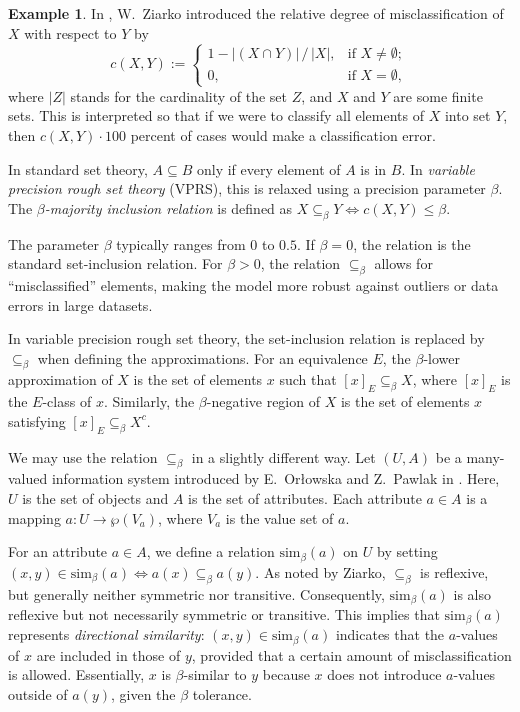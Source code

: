 \documentclass[11pt,a4paper]{amsart}
\theoremstyle{plain}
\theoremstyle{definition}
\newtheorem{example}[theorem]{Example}
\theoremstyle{remark}
\numberwithin{equation}{section}
\begin{document}
\begin{example}
In \cite{Ziarko1993}, W.~Ziarko introduced the relative degree of misclassification of $X$ with 
respect to $Y$ by
\[ c(X,Y) := 
\left \{ 
\begin{array}{ll}
1 - |(X \cap Y)| \, / \, |X|, & \text{if $X \neq \emptyset$}; \\
0, & \text{if $X = \emptyset$},
\end{array}  \right .
\]
where $|Z|$ stands for the cardinality of the set $Z$,
and $X$ and $Y$ are some finite sets.
This is interpreted so that if we were to classify all 
elements of $X$ into set $Y$, then $c(X,Y) \cdot 100$ 
percent of cases would make a classification error.

In standard set theory, $A \subseteq B$ only if every 
element of $A$ is in $B$. In 
\emph{variable precision rough set theory}
(VPRS), this is relaxed using a precision parameter 
$\beta$. The \emph{$\beta$-majority inclusion relation}
is defined as $X \subseteq_\beta Y \iff
c(X,Y) \leq \beta$.

The parameter $\beta$ typically ranges from $0$ to
$0.5$. If $\beta = 0$, the relation 
is the standard set-inclusion relation. For $\beta > 0$,
the relation $\subseteq_\beta$ allows for ``misclassified'' 
elements, making the model more robust against outliers or data errors in large datasets.

In variable precision rough set theory, the set-inclusion
relation is replaced by ${\subseteq}_\beta$ 
when defining the approximations. For an equivalence $E$,
the $\beta$-lower approximation of $X$ is the set of
elements $x$ such that $[x]_E \subseteq_\beta X$,
where $[x]_E$ is the $E$-class of $x$.
Similarly, the $\beta$-negative region of $X$ is the set 
of elements $x$ satisfying $[x]_E \subseteq_\beta X^c$.

We may use the relation ${\subseteq}_\beta$ in
a slightly different way. Let $(U,A)$
be a many-valued information system introduced
by E.~Or{\l}owska and Z.~Pawlak in \cite{OrlPaw84}.
Here, $U$ is the set of objects and  $A$ is the set 
of attributes. Each attribute $a \in A$ is a mapping 
$a \colon U \to \wp(V_a)$, where $V_a$ is
the value set of $a$.

For an attribute $a \in A$, we define a relation $\mathrm{sim}_\beta(a)$ on $U$ 
by setting 
$(x,y) \in \mathrm{sim}_\beta(a) 
\iff a(x) \subseteq_\beta a(y)$.
As noted by Ziarko, $\subseteq_\beta$ is reflexive, but generally neither symmetric nor transitive. Consequently,
$\mathrm{sim}_\beta(a)$ is also reflexive but not necessarily symmetric or transitive. This implies that 
$\mathrm{sim}_\beta(a)$ represents 
\emph{directional similarity}: 
$(x,y) \in \mathrm{sim}_\beta(a)$ indicates that the 
$a$-values of $x$ are included in those of $y$, provided 
that a certain amount of misclassification is allowed. 
Essentially, $x$ is $\beta$-similar to $y$ because $x$ does 
not introduce $a$-values outside of $a(y)$, given the 
$\beta$ tolerance.


\end{example}
\end{document}
